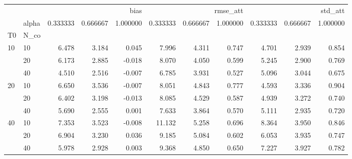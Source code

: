 \begin{tabular}{llrrrrrrrrr}
\toprule
 &  & \multicolumn{3}{r}{bias} & \multicolumn{3}{r}{rmse_att} & \multicolumn{3}{r}{std_att} \\
 & alpha & 0.333333 & 0.666667 & 1.000000 & 0.333333 & 0.666667 & 1.000000 & 0.333333 & 0.666667 & 1.000000 \\
T0 & N_co &  &  &  &  &  &  &  &  &  \\
\midrule
\multirow[t]{3}{*}{10} & 10 & 6.478 & 3.184 & 0.045 & 7.996 & 4.311 & 0.747 & 4.701 & 2.939 & 0.854 \\
 & 20 & 6.173 & 2.885 & -0.018 & 8.070 & 4.050 & 0.599 & 5.245 & 2.900 & 0.769 \\
 & 40 & 4.510 & 2.516 & -0.007 & 6.785 & 3.931 & 0.527 & 5.096 & 3.044 & 0.675 \\
\cline{1-11}
\multirow[t]{3}{*}{20} & 10 & 6.650 & 3.536 & -0.007 & 8.051 & 4.843 & 0.777 & 4.593 & 3.336 & 0.904 \\
 & 20 & 6.402 & 3.198 & -0.013 & 8.085 & 4.529 & 0.587 & 4.939 & 3.272 & 0.740 \\
 & 40 & 5.690 & 2.555 & 0.001 & 7.633 & 3.864 & 0.570 & 5.111 & 2.935 & 0.720 \\
\cline{1-11}
\multirow[t]{3}{*}{40} & 10 & 7.353 & 3.523 & -0.008 & 11.132 & 5.258 & 0.696 & 8.364 & 3.950 & 0.846 \\
 & 20 & 6.904 & 3.230 & 0.036 & 9.185 & 5.084 & 0.602 & 6.053 & 3.935 & 0.747 \\
 & 40 & 5.978 & 2.928 & 0.003 & 9.368 & 4.850 & 0.650 & 7.227 & 3.927 & 0.782 \\
\cline{1-11}
\bottomrule
\end{tabular}

